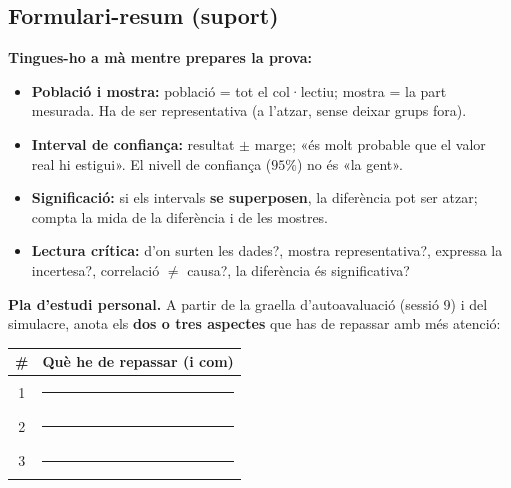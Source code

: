 \subsection{Formulari-resum (suport)}

\begin{idea}
\textbf{Tingues-ho a mà mentre prepares la prova:}
\begin{itemize}[leftmargin=1.4em, itemsep=2pt]
  \item \textbf{Població i mostra:} població = tot el col·lectiu; mostra = la part
        mesurada. Ha de ser representativa (a l'atzar, sense deixar grups fora).
  \item \textbf{Interval de confiança:} resultat $\pm$ marge; «és molt probable que el
        valor real hi estigui». El nivell de confiança ($95\%$) no és «la gent».
  \item \textbf{Significació:} si els intervals \textbf{se superposen}, la diferència pot
        ser atzar; compta la mida de la diferència i de les mostres.
  \item \textbf{Lectura crítica:} d'on surten les dades?, mostra representativa?, expressa
        la incertesa?, correlació $\neq$ causa?, la diferència és significativa?
\end{itemize}
\end{idea}

\noindent\textbf{Pla d'estudi personal.} A partir de la graella d'autoavaluació (sessió 9) i
del simulacre, anota els \textbf{dos o tres aspectes} que has de repassar amb més atenció:
\begin{center}
\renewcommand{\arraystretch}{1.5}
\begin{tabular}{c p{10.5cm}}
\toprule
\textbf{\#} & \textbf{Què he de repassar (i com)} \\
\midrule
1 & \rule{9.8cm}{0.4pt} \\
2 & \rule{9.8cm}{0.4pt} \\
3 & \rule{9.8cm}{0.4pt} \\
\bottomrule
\end{tabular}
\end{center}

